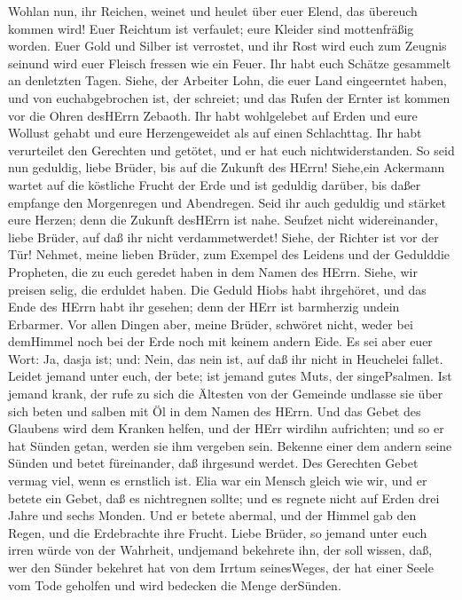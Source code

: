  Wohlan nun, ihr Reichen, weinet und heulet über euer Elend,
das übereuch kommen wird!  Euer Reichtum ist verfaulet; eure
Kleider sind mottenfräßig worden.  Euer Gold und Silber ist
verrostet, und ihr Rost wird euch zum Zeugnis seinund wird euer Fleisch
fressen wie ein Feuer. Ihr habt euch Schätze gesammelt an denletzten
Tagen.  Siehe, der Arbeiter Lohn, die euer Land eingeerntet
haben, und von euchabgebrochen ist, der schreiet; und das Rufen der
Ernter ist kommen vor die Ohren desHErrn Zebaoth.  Ihr habt
wohlgelebet auf Erden und eure Wollust gehabt und eure Herzengeweidet
als auf einen Schlachttag.  Ihr habt verurteilet den
Gerechten und getötet, und er hat euch nichtwiderstanden. 
So seid nun geduldig, liebe Brüder, bis auf die Zukunft des HErrn!
Siehe,ein Ackermann wartet auf die köstliche Frucht der Erde und ist
geduldig darüber, bis daßer empfange den Morgenregen und Abendregen.
 Seid ihr auch geduldig und stärket eure Herzen; denn die
Zukunft desHErrn ist nahe.  Seufzet nicht widereinander,
liebe Brüder, auf daß ihr nicht verdammetwerdet! Siehe, der Richter ist
vor der Tür!  Nehmet, meine lieben Brüder, zum Exempel des
Leidens und der Gedulddie Propheten, die zu euch geredet haben in dem
Namen des HErrn.  Siehe, wir preisen selig, die erduldet
haben. Die Geduld Hiobs habt ihrgehöret, und das Ende des HErrn habt ihr
gesehen; denn der HErr ist barmherzig undein Erbarmer.  Vor
allen Dingen aber, meine Brüder, schwöret nicht, weder bei demHimmel
noch bei der Erde noch mit keinem andern Eide. Es sei aber euer Wort:
Ja, dasja ist; und: Nein, das nein ist, auf daß ihr nicht in Heuchelei
fallet.  Leidet jemand unter euch, der bete; ist jemand
gutes Muts, der singePsalmen.  Ist jemand krank, der rufe
zu sich die Ältesten von der Gemeinde undlasse sie über sich beten und
salben mit Öl in dem Namen des HErrn.  Und das Gebet des
Glaubens wird dem Kranken helfen, und der HErr wirdihn aufrichten; und
so er hat Sünden getan, werden sie ihm vergeben sein. 
Bekenne einer dem andern seine Sünden und betet füreinander, daß
ihrgesund werdet. Des Gerechten Gebet vermag viel, wenn es ernstlich
ist.  Elia war ein Mensch gleich wie wir, und er betete ein
Gebet, daß es nichtregnen sollte; und es regnete nicht auf Erden drei
Jahre und sechs Monden.  Und er betete abermal, und der
Himmel gab den Regen, und die Erdebrachte ihre Frucht. 
Liebe Brüder, so jemand unter euch irren würde von der Wahrheit,
undjemand bekehrete ihn,  der soll wissen, daß, wer den
Sünder bekehret hat von dem Irrtum seinesWeges, der hat einer Seele vom
Tode geholfen und wird bedecken die Menge derSünden.
